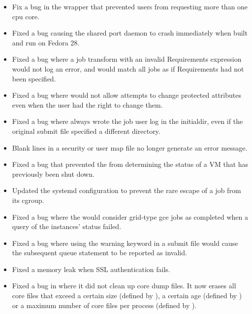 \begin{itemize}

\item Fix a bug in the  wrapper that prevented users from requesting more
than one cpu core.
\item Fixed a bug causing the shared port daemon to crash immediately when
built and run on Fedora 28.

\item Fixed a bug where a job transform with an invalid Requirements expression would not log an
error, and would match all jobs as if Requirements had not been specified.

\item Fixed a bug where  would not allow attempts to change protected attributes even
when the user had the right to change them.

\item Fixed a bug where  always wrote the job
user log in the initialdir, even if the original submit file specified
a different directory.

\item Blank lines in a security or user map file no longer generate
an error message.

\item Fixed a bug that prevented the  from determining
the status of a VM that has previously been shut down.

\item Updated the systemd configuration to prevent the rare escape of a job
from its cgroup.

\item Fixed a bug where the  would consider grid-type
gce jobs as completed when a query of the instances' status failed.

\item Fixed a bug where using the warning keyword in a submit file would cause
the subsequent queue statement to be reported as invalid.

\item Fixed a memory leak when SSL authentication fails.

\item Fixed a bug in  where it did not clean up core dump files.
It now erases all core files that exceed a certain size (defined by 
), a certain age (defined by 
) or a maximum number of core files per
process (defined by ).

\end{itemize}

